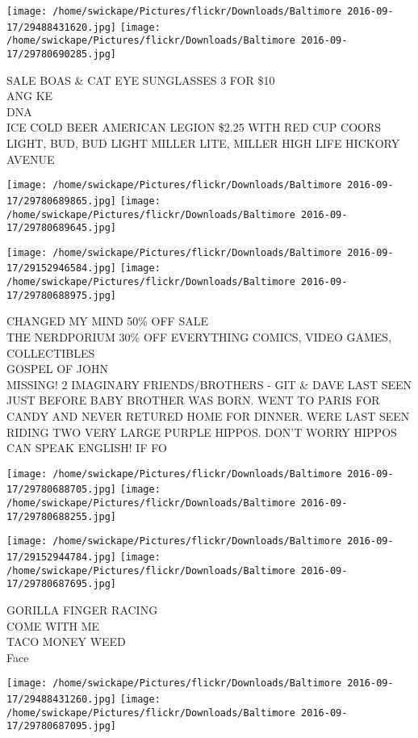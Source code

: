 \documentclass[10pt,letterpaper]{article}
\begin{document}
\texttt{[image: /home/swickape/Pictures/flickr/Downloads/Baltimore 2016-09-17/29488431620.jpg]}
\texttt{[image: /home/swickape/Pictures/flickr/Downloads/Baltimore 2016-09-17/29780690285.jpg]}

SALE BOAS \& CAT EYE SUNGLASSES 3 FOR \$10\\
ANG KE\\
DNA\\
ICE COLD BEER AMERICAN LEGION \$2.25 WITH RED CUP COORS LIGHT, BUD, BUD LIGHT MILLER LITE, MILLER HIGH LIFE HICKORY AVENUE
\pagebreak

\texttt{[image: /home/swickape/Pictures/flickr/Downloads/Baltimore 2016-09-17/29780689865.jpg]}
\texttt{[image: /home/swickape/Pictures/flickr/Downloads/Baltimore 2016-09-17/29780689645.jpg]}

\texttt{[image: /home/swickape/Pictures/flickr/Downloads/Baltimore 2016-09-17/29152946584.jpg]}
\texttt{[image: /home/swickape/Pictures/flickr/Downloads/Baltimore 2016-09-17/29780688975.jpg]}

CHANGED MY MIND 50\% OFF SALE\\
THE NERDPORIUM 30\% OFF EVERYTHING COMICS, VIDEO GAMES, COLLECTIBLES\\
GOSPEL OF JOHN\\
MISSING!  2 IMAGINARY FRIENDS/BROTHERS {-} GIT \& DAVE LAST SEEN JUST BEFORE BABY BROTHER WAS BORN.  WENT TO PARIS FOR CANDY AND NEVER RETURED HOME FOR DINNER.  WERE LAST SEEN RIDING TWO VERY LARGE PURPLE HIPPOS.  DON'T WORRY HIPPOS CAN SPEAK ENGLISH!  IF FO
\pagebreak

\texttt{[image: /home/swickape/Pictures/flickr/Downloads/Baltimore 2016-09-17/29780688705.jpg]}
\texttt{[image: /home/swickape/Pictures/flickr/Downloads/Baltimore 2016-09-17/29780688255.jpg]}

\texttt{[image: /home/swickape/Pictures/flickr/Downloads/Baltimore 2016-09-17/29152944784.jpg]}
\texttt{[image: /home/swickape/Pictures/flickr/Downloads/Baltimore 2016-09-17/29780687695.jpg]}

GORILLA FINGER RACING\\
COME WITH ME\\
TACO MONEY WEED\\
Face
\pagebreak

\texttt{[image: /home/swickape/Pictures/flickr/Downloads/Baltimore 2016-09-17/29488431260.jpg]}
\texttt{[image: /home/swickape/Pictures/flickr/Downloads/Baltimore 2016-09-17/29780687095.jpg]}
\end{document}
